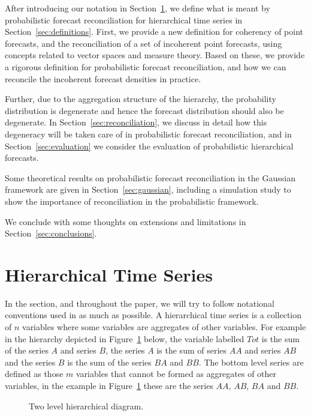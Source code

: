 \documentclass[a4paper, 11pt]{article}
\begin{document}
After introducing our notation in Section~\ref{sec:notation}, we define what is meant by probabilistic forecast reconciliation for hierarchical time series in Section~\ref{sec:definitions}. First, we provide a new definition for coherency of point forecasts, and the reconciliation of a set of incoherent point forecasts, using  concepts related to vector spaces and measure theory. Based on these, we provide a rigorous definition for probabilistic forecast reconciliation, and how we can reconcile the incoherent forecast densities in practice. 

Further, due to the aggregation structure of the hierarchy, the probability distribution is degenerate and hence the forecast distribution should also be degenerate. In Section~\ref{sec:reconciliation}, we discuss in detail how this degeneracy will be taken care of in probabilistic forecast reconciliation, and in Section~\ref{sec:evaluation} we consider the evaluation of probabilistic hierarchical forecasts. 

Some theoretical results on probabilistic forecast reconciliation in the Gaussian framework are given in Section~\ref{sec:gaussian}, including a simulation study to show the importance of reconciliation in the probabilistic framework. 

We conclude with some thoughts on extensions and limitations in Section~\ref{sec:conclusions}.


\section{Hierarchical Time Series}\label{sec:notation}

In the section, and throughout the paper, we will try to follow notational conventions used in \citet{Wickramasuriya2017} as much as possible.  A hierarchical time series is a collection of $n$ variables where some variables are aggregates of other variables.  For example in the hierarchy depicted in Figure~\ref{fig1} below, the variable labelled $Tot$ is the sum of the series $A$
and series $B$, the series $A$ is the sum of series $AA$ and series $AB$ and the series $B$ is the sum of the series $BA$ and $BB$.  The bottom level series are defined as those $m$ variables that cannot be formed as aggregates of other variables, in the example in Figure~\ref{fig1} these are the series $AA$, $AB$, $BA$ and $BB$. 

\begin{figure}[H]
  \begin{center}
      
     
    \qobitree
  \end{center}
  \caption{Two level hierarchical diagram.}\label{fig1}
\end{figure}
\end{document}
